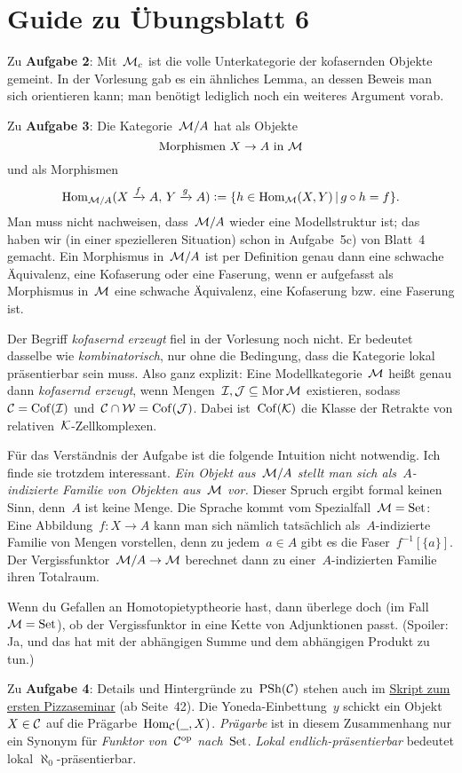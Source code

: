 \documentclass{uebblatt}
\begin{document}
\section*{Guide zu Übungsblatt 6}

Zu \textbf{Aufgabe 2}: Mit~$\mathcal{M}_c$ ist die volle Unterkategorie der kofasernden
Objekte gemeint. In der Vorlesung gab es ein ähnliches Lemma, an dessen Beweis
man sich orientieren kann; man benötigt lediglich noch ein weiteres Argument
vorab.

Zu \textbf{Aufgabe 3}: Die Kategorie~$\mathcal{M}/A$ hat als Objekte
\[ \text{Morphismen~$X \to A$ in~$\mathcal{M}$} \]
und als Morphismen
\[ \mathrm{Hom}_{\mathcal{M}/A}(X \xrightarrow{f} A,\, Y \xrightarrow{g} A) \vcentcolon= \{ h \in \mathrm{Hom}_{\mathcal{M}}(X,Y) \,|\,
  g \circ h = f \}. \]
Man muss nicht nachweisen, dass~$\mathcal{M}/A$ wieder eine Modellstruktur ist; das
haben wir (in einer spezielleren Situation) schon in Aufgabe~5c) von Blatt~4
gemacht. Ein Morphismus in~$\mathcal{M}/A$ ist per Definition genau dann eine schwache
Äquivalenz, eine Kofaserung oder eine Faserung, wenn er aufgefasst als
Morphismus in~$\mathcal{M}$ eine schwache Äquivalenz, eine Kofaserung bzw. eine Faserung
ist.

Der Begriff \emph{kofasernd erzeugt} fiel in der Vorlesung noch nicht. Er
bedeutet dasselbe wie \emph{kombinatorisch}, nur ohne die Bedingung, dass die
Kategorie lokal präsentierbar sein muss. Also ganz explizit: Eine
Modellkategorie~$\mathcal{M}$ heißt genau dann \emph{kofasernd erzeugt}, wenn
Mengen~$\mathcal{I}, \mathcal{J} \subseteq \operatorname{Mor} \mathcal{M}$ existieren, sodass~$\mathcal{C} = \mathrm{Cof}(\mathcal{I})$ und~$\mathcal{C} \cap
\mathcal{W} = \mathrm{Cof}(\mathcal{J})$. Dabei ist~$\mathrm{Cof}(\mathcal{K})$ die Klasse der Retrakte von
relativen~$\mathcal{K}$-Zellkomplexen.

Für das Verständnis der Aufgabe ist die folgende Intuition nicht notwendig. Ich
finde sie trotzdem interessant. \emph{Ein Objekt aus~$\mathcal{M}/A$ stellt man sich
als~$A$-indizierte Familie von Objekten aus~$\mathcal{M}$ vor.} Dieser Spruch ergibt formal
keinen Sinn, denn~$A$ ist keine Menge. Die Sprache kommt vom Spezialfall~$\mathcal{M} =
\mathrm{Set}$: Eine Abbildung~$f : X \to A$ kann man sich nämlich tatsächlich
als~$A$-indizierte Familie von Mengen vorstellen, denn zu jedem~$a \in A$ gibt
es die Faser~$f^{-1}[\{a\}]$. Der Vergissfunktor~$\mathcal{M}/A \to \mathcal{M}$ berechnet dann
zu einer~$A$-indizierten Familie ihren Totalraum.

Wenn du Gefallen an Homotopietyptheorie hast, dann überlege doch (im Fall~$\mathcal{M} =
\mathrm{Set}$), ob der Vergissfunktor in eine Kette von Adjunktionen passt.
(Spoiler: Ja, und das hat mit der abhängigen Summe und dem abhängigen Produkt
zu tun.)

Zu \textbf{Aufgabe 4}: Details und Hintergründe zu~$\mathrm{PSh}(\mathcal{C})$ stehen auch im
\href{http://pizzaseminar.speicherleck.de/skript1/pizzaseminar.pdf}{Skript zum ersten
Pizzaseminar} (ab Seite~42). Die Yoneda-Einbettung~$y$ schickt ein Objekt~$X
\in \mathcal{C}$ auf die Prägarbe~$\mathrm{Hom}_{\mathcal{C}}(\underline{\ \ }, X)$. \emph{Prägarbe} ist
in diesem Zusammenhang nur ein Synonym für \emph{Funktor von~$\mathcal{C}^{\mathrm{op}}$
nach~$\mathrm{Set}$}. \emph{Lokal endlich-präsentierbar} bedeutet lokal
$\aleph_0$-präsentierbar.
\end{document}
